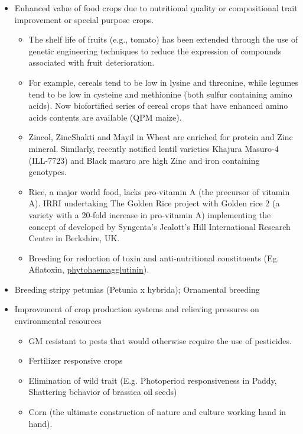 \documentclass[11pt,ignorenonframetext,aspectratio=169]{beamer}
\providecommand{\tightlist}{%
  \setlength{\itemsep}{0pt}\setlength{\parskip}{0pt}}
\begin{document}
\begin{frame}{}
\protect\hypertarget{section-15}{}
\begin{itemize}
\tightlist
\item
  Enhanced value of food crops due to nutritional quality or
  compositional trait improvement or special purpose crops.

  \begin{itemize}
  \tightlist
  \item
    The shelf life of fruits (e.g., tomato) has been extended through
    the use of genetic engineering techniques to reduce the expression
    of compounds associated with fruit deterioration.
  \item
    For example, cereals tend to be low in lysine and threonine, while
    legumes tend to be low in cysteine and methionine (both sulfur
    containing amino acids). Now biofortified series of cereal crops
    that have enhanced amino acids contents are available (QPM maize).
  \item
    Zincol, ZincShakti and Mayil in Wheat are enriched for protein and
    Zinc mineral. Similarly, recently notified lentil varieties Khajura
    Masuro-4 (ILL-7723) and Black masuro are high Zinc and iron
    containing genotypes.
  \item
    Rice, a major world food, lacks pro-vitamin A (the precursor of
    vitamin A). IRRI undertaking The Golden Rice project with Golden
    rice 2 (a variety with a 20-fold increase in pro-vitamin A)
    implementing the concept of developed by Syngenta's Jealott's Hill
    International Research Centre in Berkshire, UK.
  \item
    Breeding for reduction of toxin and anti-nutritional constituents
    (Eg. Aflatoxin,
    \href{https://en.wikipedia.org/wiki/Phytohaemagglutinin}{phytohaemagglutinin}).
  \end{itemize}
\end{itemize}
\end{frame}

\begin{frame}{}
\protect\hypertarget{section-16}{}
\begin{itemize}
\tightlist
\item
  Breeding stripy petunias (Petunia x hybrida); Ornamental breeding
\item
  Improvement of crop production systems and relieving pressures on
  environmental resources

  \begin{itemize}
  \tightlist
  \item
    GM resistant to pests that would otherwise require the use of
    pesticides.
  \item
    Fertilizer responsive crops
  \item
    Elimination of wild trait (E.g. Photoperiod responsiveness in Paddy,
    Shattering behavior of brassica oil seeds)
  \item
    Corn (the ultimate construction of nature and culture working hand
    in hand).
  \end{itemize}
\end{itemize}
\end{frame}
\end{document}
